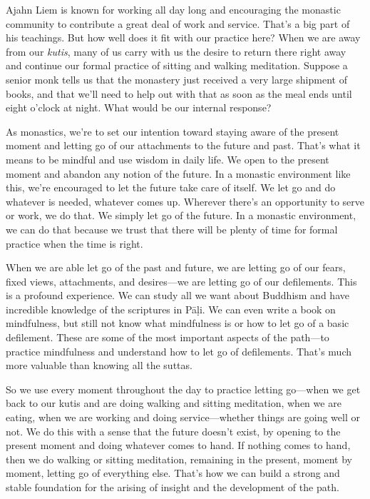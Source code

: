 
Ajahn Liem is known for working all day long and encouraging the 
monastic community to contribute a great deal of work and service. 
That's a big part of his teachings. But how well does it fit with our 
practice here? When we are away from our \emph{kutis}, many of us carry 
with us the desire to return there right away and continue our formal 
practice of sitting and walking meditation. Suppose a senior monk tells 
us that the monastery just received a very large shipment of books, and 
that we'll need to help out with that as soon as the meal ends until 
eight o'clock at night. What would be our internal response?

As monastics, we're to set our intention toward staying aware of the 
present moment and letting go of our attachments to the future and 
past. That's what it means to be mindful and use wisdom in daily life. 
We open to the present moment and abandon any notion of the future. In 
a monastic environment like this, we're encouraged to let the future 
take care of itself. We let go and do whatever is needed, whatever 
comes up. Wherever there's an opportunity to serve or work, we do that. 
We simply let go of the future. In a monastic environment, we can do 
that because we trust that there will be plenty of time for formal 
practice when the time is right.

When we are able let go of the past and future, we are letting go of 
our fears, fixed views, attachments, and desires---we are letting go of 
our defilements. This is a profound experience. We can study all we 
want about Buddhism and have incredible knowledge of the scriptures in 
Pāḷi. We can even write a book on mindfulness, but still not know 
what mindfulness is or how to let go of a basic defilement. These are 
some of the most important aspects of the path---to practice 
mindfulness and understand how to let go of defilements. That's much 
more valuable than knowing all the suttas.

So we use every moment throughout the day to practice letting go---when 
we get back to our kutis and are doing walking and sitting meditation, 
when we are eating, when we are working and doing service---whether 
things are going well or not. We do this with a sense that the future 
doesn't exist, by opening to the present moment and doing whatever 
comes to hand. If nothing comes to hand, then we do walking or sitting 
meditation, remaining in the present, moment by moment, letting go of 
everything else. That's how we can build a strong and stable foundation 
for the arising of insight and the development of the path.

